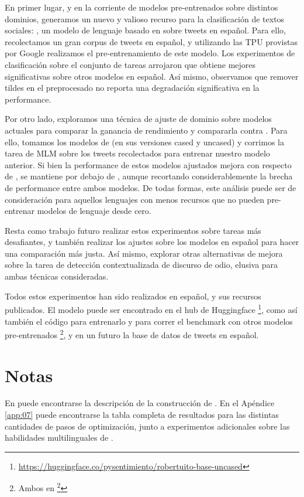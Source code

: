 En primer lugar, y en la corriente de modelos pre-entrenados sobre distintos dominios, generamos un nuevo y valioso recurso para la clasificación de textos sociales: \robertuito{}, un modelo de lenguaje basado en \roberta{} sobre tweets en español. Para ello, recolectamos un gran corpus de tweets en español, y utilizando las TPU provistas por Google realizamos el pre-entrenamiento de este modelo. Los experimentos de clasificación sobre el conjunto de tareas arrojaron que \robertuito{} obtiene mejores significativas sobre otros modelos en español. Así mismo, observamos que remover tildes en el preprocesado no reporta una degradación significativa en la performance.

Por otro lado, exploramos una técnica de ajuste de dominio sobre modelos actuales para comparar la ganancia de rendimiento y compararla contra \robertuito{}. Para ello, tomamos los modelos de \beto{} (en sus versiones cased y uncased) y corrimos la tarea de MLM sobre los tweets recolectados para entrenar nuestro modelo anterior. Si bien la performance de estos modelos ajustados mejora con respecto de \beto{}, se mantiene por debajo de \robertuito{}, aunque recortando considerablemente la brecha de performance entre ambos modelos. De todas formas, este análisis puede ser de consideración para aquellos lenguajes con menos recursos que no pueden pre-entrenar modelos de lenguaje desde cero.

Resta como trabajo futuro realizar estos experimentos sobre tareas más desafiantes, y también realizar los ajustes sobre los modelos \roberta{} en español para hacer una comparación más justa. Así mismo, explorar otras alternativas de mejora sobre la tarea de detección contextualizada de discurso de odio, elusiva para ambas técnicas consideradas.

Todos estos experimentos han sido realizados en español, y sus recursos publicados. El modelo puede ser encontrado en el hub de Huggingface \footnote{\url{https://huggingface.co/pysentimiento/robertuito-base-uncased}}, como así también el código para entrenarlo y para correr el benchmark con otros modelos pre-entrenados \footnote{Ambos en  \footnote{\url{https://github.com/pysentimiento/robertuito}}}, y en un futuro la base de datos de tweets en español.

\section{Notas}

En \citet{perez2021robertuito} puede encontrarse la descripción de la construcción de \robertuito{}. En el Apéndice \ref{app:07} puede encontrarse la tabla completa de resultados para las distintas cantidades de pasos de optimización, junto a experimentos adicionales sobre las habilidades multilinguales de \robertuito{}.

